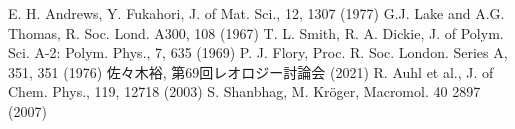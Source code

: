 \begin{columns}[totalwidth=.85\linewidth]
    \column{\textwidth}
    \vspace{-10mm}
        \beamertemplatetextbibitems
        \small
        \begin{thebibliography}{99}
             E. H. Andrews, Y. Fukahori, J. of Mat. Sci., 12, 1307 (1977)
             G.J. Lake and A.G. Thomas, R. Soc. Lond. A300, 108 (1967)
             T. L. Smith, R. A. Dickie, J. of Polym. Sci. A-2: Polym. Phys., 7, 635 (1969)
             P. J. Flory, Proc. R. Soc. London. Series A, 351, 351 (1976)
             佐々木裕, 第69回レオロジー討論会 (2021)
             R. Auhl et al., J. of Chem. Phys., 119, 12718 (2003)
             S. Shanbhag, M. Kr\"{o}ger, Macromol. 40 2897 (2007)
        \end{thebibliography}
    \end{columns}